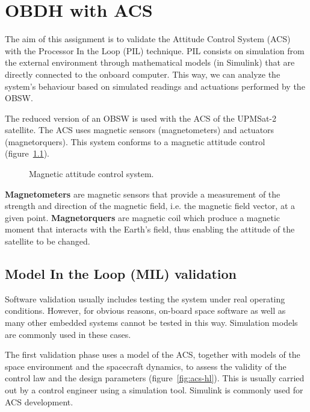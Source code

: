 \chapter{OBDH with ACS}\label{ch:obdh-acs}

The aim of this assignment is to validate the Attitude Control System (ACS)
with the Processor In the Loop (PIL) technique.
PIL consists on simulation from the external environment
through mathematical models (in Simulink)
that are directly connected to the onboard computer.
This way, we can analyze the system's behaviour
based on simulated readings and actuations performed by the OBSW.

The reduced version of an OBSW
is used with the ACS of the UPMSat-2 satellite.
The ACS uses magnetic sensors (magnetometers) and actuators (magnetorquers).
This system conforms to a magnetic attitude control (figure~\ref{fig:acs}).

\begin{figure}[hbtp!]
	\caption{Magnetic attitude control system.}
	\label{fig:acs}
\end{figure}

\textbf{Magnetometers} are magnetic sensors
that provide a measurement of the strength
and direction of the magnetic field, i.e. the magnetic field vector,
at a given point.
\textbf{Magnetorquers} are magnetic coil which produce a magnetic moment that interacts with the Earth's field,
thus enabling the attitude of the satellite to be changed.


\section{Model In the Loop (MIL) validation}

Software validation usually includes testing the system under real operating conditions.
However, for obvious reasons, on-board space software as well as many other embedded systems cannot be tested in this way.
Simulation models are commonly used in these cases.

The first validation phase uses a model of the ACS,
together with models of the space environment and the spacecraft dynamics,
to assess the validity of the control law and the design parameters (figure~\ref{fig:acs-hl}).
This is usually carried out by a control engineer using a simulation tool.
Simulink is commonly used for ACS development.

